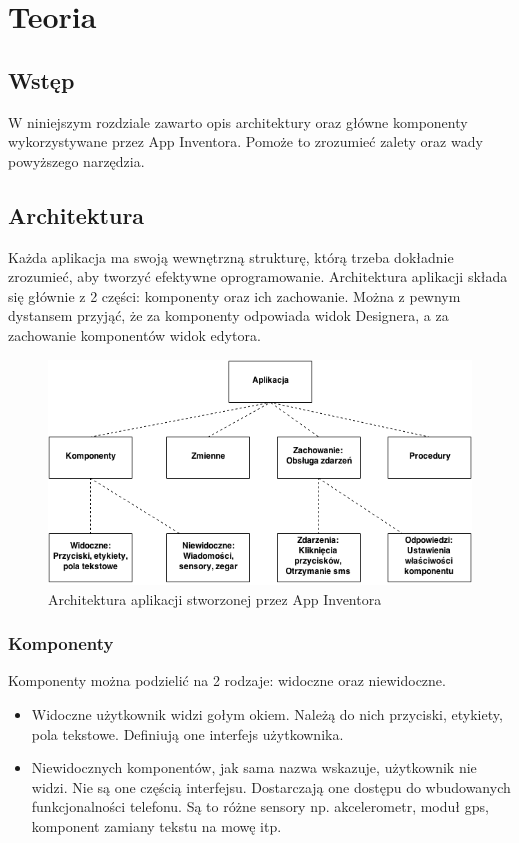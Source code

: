 \chapter{Teoria}
\label{c3}

\section{Wstęp}
\label{c31}

W niniejszym rozdziale zawarto opis architektury oraz główne komponenty wykorzystywane przez App Inventora. Pomoże to zrozumieć zalety oraz wady powyższego narzędzia.

\section{Architektura}
\label{c32}

Każda aplikacja ma swoją wewnętrzną strukturę, którą trzeba dokładnie zrozumieć, aby tworzyć efektywne oprogramowanie. Architektura aplikacji składa się głównie z 2 części: komponenty oraz ich zachowanie. Można z pewnym dystansem przyjąć, że za komponenty odpowiada widok Designera, a za zachowanie komponentów widok edytora.

\begin{figure}[th] 
\centering\includegraphics[width=12cm]{figures/architektura}
\caption{Architektura aplikacji stworzonej przez App Inventora\cite{appinventor:architektura}}
\end{figure}

\subsection{Komponenty}
\label{c321}

Komponenty można podzielić na 2 rodzaje: widoczne oraz niewidoczne. 
\begin{itemize}
\item Widoczne użytkownik widzi gołym okiem. Należą do nich przyciski, etykiety, pola tekstowe. Definiują one interfejs użytkownika.
\item Niewidocznych komponentów, jak sama nazwa wskazuje, użytkownik nie widzi. Nie są one częścią interfejsu. Dostarczają one dostępu do wbudowanych funkcjonalności telefonu. Są to różne sensory np. akcelerometr, moduł gps, komponent zamiany tekstu na mowę itp.
\end{itemize}

